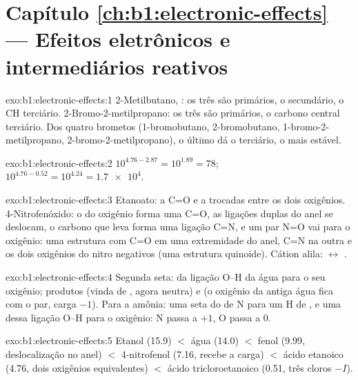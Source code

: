 \section*{Capítulo \ref{ch:b1:electronic-effects} --- Efeitos eletrônicos e intermediários reativos}

\begin{solution}{exo:b1:electronic-effects:1}
2-Metilbutano, : os três  são primários,
o  secundário, o CH terciário. 2-Bromo-2-metilpropano: os três
 são primários, o carbono central terciário. Dos quatro brometos
 (1-bromobutano, 2-bromobutano, 1-bromo-2-metilpropano,
2-bromo-2-metilpropano), o último dá o  terciário, o mais
estável.
\end{solution}

\begin{solution}{exo:b1:electronic-effects:2}
$10^{4.76 - 2.87} = 10^{1.89} = 78$; $10^{4.76 - 0.52} = 10^{4.24} =
\num{1.7e4}$.
\end{solution}

\begin{solution}{exo:b1:electronic-effects:3}
Etanoato: a C=O e a  trocadas entre os dois oxigênios.
4-Nitrofenóxido: o  do oxigênio forma uma C=O, as
ligações duplas do anel se deslocam, o carbono que leva  forma
uma ligação C=N, e um par N=O vai para o oxigênio: uma estrutura com C=O
em uma extremidade do anel, C=N na outra e os dois oxigênios do nitro
negativos (uma estrutura quinoide). Cátion alila:
 $\leftrightarrow$ .
\end{solution}

\begin{solution}{exo:b1:electronic-effects:4}
Segunda seta: da ligação O--H da água para o seu oxigênio; produtos
 (vinda de , agora neutra) e  (o oxigênio da
antiga água fica com o par, carga $-1$). Para a amônia: uma seta do  de N para um H de , e uma dessa ligação O--H para o
oxigênio: N passa a $+1$, O passa a 0.
\end{solution}

\begin{solution}{exo:b1:electronic-effects:5}
Etanol (15.9) $<$ água (14.0) $<$ fenol (9.99, deslocalização no anel)
$<$ 4-nitrofenol (7.16,  recebe a carga) $<$ ácido etanoico (4.76,
dois oxigênios equivalentes) $<$ ácido tricloroetanoico (0.51, três
cloros $-I$).
\end{solution}

